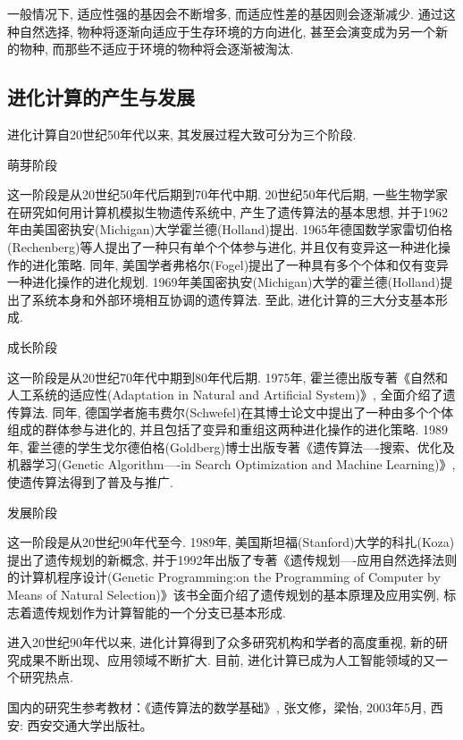 \begin{remark}
    一般情况下, 适应性强的基因会不断增多, 而适应性差的基因则会逐渐减少.
    通过这种自然选择, 物种将逐渐向适应于生存环境的方向进化, 甚至会演变成为另一个新的物种, 而那些不适应于环境的物种将会逐渐被淘汰.
\end{remark}
\subsection{进化计算的产生与发展}
 进化计算自20世纪50年代以来, 其发展过程大致可分为三个阶段.

       萌芽阶段

     这一阶段是从20世纪50年代后期到70年代中期. 20世纪50年代后期, 一些生物学家在研究如何用计算机模拟生物遗传系统中, 产生了遗传算法的基本思想, 并于1962年由美国密执安(Michigan)大学霍兰德(Holland)提出.
     1965年德国数学家雷切伯格(Rechenberg)等人提出了一种只有单个个体参与进化, 并且仅有变异这一种进化操作的进化策略.
     同年, 美国学者弗格尔(Fogel)提出了一种具有多个个体和仅有变异一种进化操作的进化规划.
     1969年美国密执安(Michigan)大学的霍兰德(Holland)提出了系统本身和外部环境相互协调的遗传算法. 至此, 进化计算的三大分支基本形成.

      成长阶段

     这一阶段是从20世纪70年代中期到80年代后期. 1975年, 霍兰德出版专著《自然和人工系统的适应性(Adaptation in Natural and Artificial System)》, 全面介绍了遗传算法.
     同年, 德国学者施韦费尔(Schwefel)在其博士论文中提出了一种由多个个体组成的群体参与进化的, 并且包括了变异和重组这两种进化操作的进化策略.
     1989年, 霍兰德的学生戈尔德伯格(Goldberg)博士出版专著《遗传算法----搜索、优化及机器学习(Genetic Algorithm----in Search Optimization and Machine Learning)》, 使遗传算法得到了普及与推广.

     发展阶段

     这一阶段是从20世纪90年代至今. 1989年, 美国斯坦福(Stanford)大学的科扎(Koza)提出了遗传规划的新概念, 并于1992年出版了专著《遗传规划----应用自然选择法则的计算机程序设计(Genetic Programming:on the Programming of Computer by Means of Natural Selection)》该书全面介绍了遗传规划的基本原理及应用实例, 标志着遗传规划作为计算智能的一个分支已基本形成.

    进入20世纪90年代以来, 进化计算得到了众多研究机构和学者的高度重视, 新的研究成果不断出现、应用领域不断扩大.
    目前, 进化计算已成为人工智能领域的又一个研究热点. 
    
    国内的研究生参考教材：《遗传算法的数学基础》,  张文修，梁怡, 2003年5月, 西安: 西安交通大学出版社。


